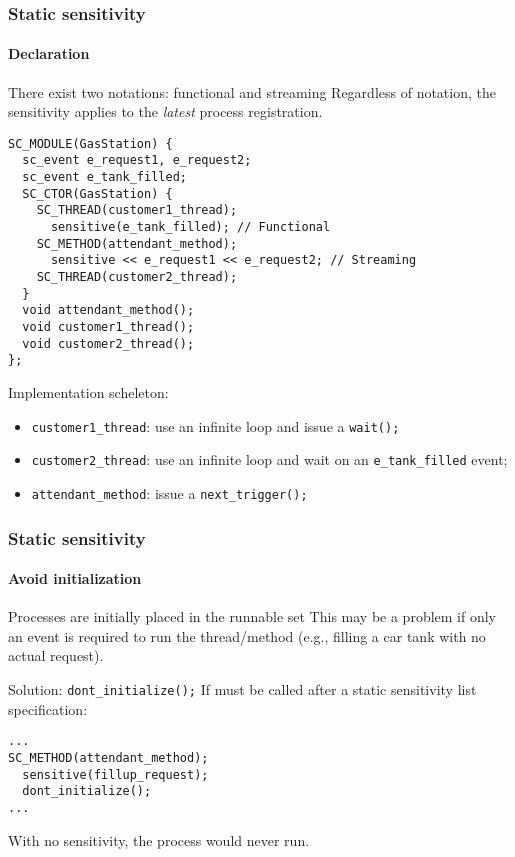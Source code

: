 \begin{frame}[fragile]
\frametitle{Static sensitivity}
\framesubtitle{Declaration}

{\scriptsize
\begin{block}{{\small There exist two notations: functional and streaming}}
\vspace{0.1em}
Regardless of notation, the sensitivity applies to the {\em latest} process registration.
\begin{verbatim}
SC_MODULE(GasStation) {
  sc_event e_request1, e_request2;
  sc_event e_tank_filled;
  SC_CTOR(GasStation) {
    SC_THREAD(customer1_thread);
      sensitive(e_tank_filled); // Functional
    SC_METHOD(attendant_method);
      sensitive << e_request1 << e_request2; // Streaming
    SC_THREAD(customer2_thread);
  }
  void attendant_method();
  void customer1_thread();
  void customer2_thread();
};
\end{verbatim}
\vspace{-0.5em}
\pause
Implementation scheleton:
\begin{itemize}
\item \texttt{customer1\_thread}: use an infinite loop and issue a \texttt{wait();}
\item \texttt{customer2\_thread}: use an infinite loop and wait on an \texttt{e\_tank\_filled} event; 
\item \texttt{attendant\_method}: issue a \texttt{next\_trigger();}
\end{itemize}
\end{block}
}
\end{frame}

\begin{frame}[fragile]
\frametitle{Static sensitivity}
\framesubtitle{Avoid initialization}

\begin{block}{Processes are initially placed in the runnable set}
This may be a problem if only an event is required to run the thread/method (e.g., filling a car tank with no actual request).
\end{block}
\pause
\begin{block}{Solution: \texttt{dont\_initialize();}}
If must be called after a static sensitivity list specification:
\begin{verbatim}
...
SC_METHOD(attendant_method);
  sensitive(fillup_request);
  dont_initialize();
...
\end{verbatim}
With no sensitivity, the process would never run.
\end{block}
\end{frame}